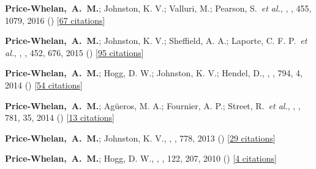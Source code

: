 \item[{\color{deemph}\scriptsize6}]\textbf{Price-Whelan,~A.~M.}; Johnston, K. V.; Valluri, M.; Pearson, S.~\textit{et al.}, , \mnras, 455, 1079, 2016 () [\href{http://adsabs.harvard.edu/abs/2016MNRAS.455.1079P}{67 citations}]

\item[{\color{deemph}\scriptsize5}]\textbf{Price-Whelan,~A.~M.}; Johnston, K. V.; Sheffield, A. A.; Laporte, C. F. P.~\textit{et al.}, , \mnras, 452, 676, 2015 () [\href{http://adsabs.harvard.edu/abs/2015MNRAS.452..676P}{95 citations}]

\item[{\color{deemph}\scriptsize4}]\textbf{Price-Whelan,~A.~M.}; Hogg, D. W.; Johnston, K. V.; Hendel, D., , \apj, 794, 4, 2014 () [\href{http://adsabs.harvard.edu/abs/2014ApJ...794....4P}{54 citations}]

\item[{\color{deemph}\scriptsize3}]\textbf{Price-Whelan,~A.~M.}; Ag{\"u}eros, M. A.; Fournier, A. P.; Street, R.~\textit{et al.}, , \apj, 781, 35, 2014 () [\href{http://adsabs.harvard.edu/abs/2014ApJ...781...35P}{13 citations}]

\item[{\color{deemph}\scriptsize2}]\textbf{Price-Whelan,~A.~M.}; Johnston, K. V., , \apj, 778, 2013 () [\href{http://adsabs.harvard.edu/abs/2013ApJ...778L..12P}{29 citations}]

\item[{\color{deemph}\scriptsize1}]\textbf{Price-Whelan,~A.~M.}; Hogg, D. W., , \pasp, 122, 207, 2010 () [\href{http://adsabs.harvard.edu/abs/2010PASP..122..207P}{4 citations}]